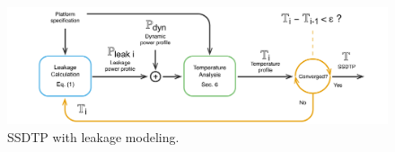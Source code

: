 \begin{figure}
  \centering
  \includegraphics[width=0.8\linewidth]{assets/leakage.pdf}
  \caption{SSDTP with leakage modeling.}
  \label{fig:leakage}
  \vspace{10pt}
\end{figure}
